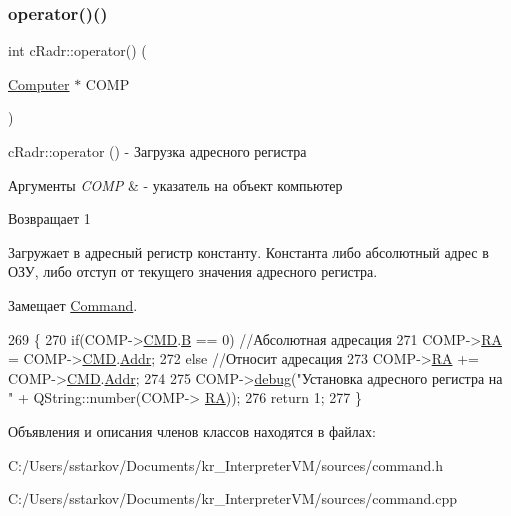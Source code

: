 \subsubsection{\texorpdfstring{operator()()}{operator()()}}
{\footnotesize\ttfamily int c\+Radr\+::operator() (\begin{DoxyParamCaption}\item[{\hyperlink{class_computer}{Computer} $\ast$}]{C\+O\+MP }\end{DoxyParamCaption})\hspace{0.3cm}{\ttfamily [virtual]}}



c\+Radr\+::operator () -\/ Загрузка адресного регистра 


\begin{DoxyParams}{Аргументы}
{\em C\+O\+MP} & -\/ указатель на объект компьютер \\
\hline
\end{DoxyParams}
\begin{DoxyReturn}{Возвращает}
1
\end{DoxyReturn}
Загружает в адресный регистр константу. Константа либо абсолютный адрес в ОЗУ, либо отступ от текущего значения адресного регистра. 

Замещает \hyperlink{class_command_a79939b66f3de892e91d7710844294716}{Command}.


\begin{DoxyCode}
269 \{
270     \textcolor{keywordflow}{if}(COMP->\hyperlink{class_computer_a8423168f7cc356b4dd36977603798caf}{CMD}.\hyperlink{struct_computer_1_1command_a3e0d1e527de9f60594023a362b08a7de}{B} == 0) \textcolor{comment}{//Абсолютная адресация}
271         COMP->\hyperlink{class_computer_a499d0b2c857c2977dd5702906705f79e}{RA} = COMP->\hyperlink{class_computer_a8423168f7cc356b4dd36977603798caf}{CMD}.\hyperlink{struct_computer_1_1command_a0e07591012953413797506f7bc3cb1a7}{Addr};
272     \textcolor{keywordflow}{else} \textcolor{comment}{//Относит адресация}
273         COMP->\hyperlink{class_computer_a499d0b2c857c2977dd5702906705f79e}{RA} += COMP->\hyperlink{class_computer_a8423168f7cc356b4dd36977603798caf}{CMD}.\hyperlink{struct_computer_1_1command_a0e07591012953413797506f7bc3cb1a7}{Addr};
274 
275     COMP->\hyperlink{class_computer_a10ca6c6b200630119201de16d7368e0f}{debug}(\textcolor{stringliteral}{"Установка адресного регистра на "} + QString::number(COMP->
      \hyperlink{class_computer_a499d0b2c857c2977dd5702906705f79e}{RA}));
276     \textcolor{keywordflow}{return} 1;
277 \}
\end{DoxyCode}


Объявления и описания членов классов находятся в файлах\+:\begin{DoxyCompactItemize}
\item 
C\+:/\+Users/sstarkov/\+Documents/kr\+\_\+\+Interpreter\+V\+M/sources/command.\+h\item 
C\+:/\+Users/sstarkov/\+Documents/kr\+\_\+\+Interpreter\+V\+M/sources/command.\+cpp\end{DoxyCompactItemize}

